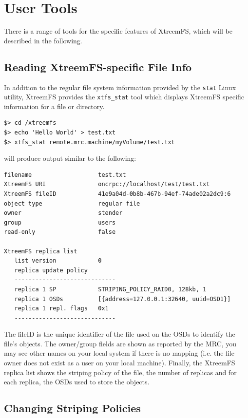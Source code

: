 \documentclass[a4paper,10pt]{book}
\begin{document}
\section{User Tools}

There is a range of tools for the specific features of XtreemFS, which will be described in the following.

\subsection{Reading XtreemFS-specific File Info}

In addition to the regular file system information provided by the \texttt{stat} Linux utility, XtreemFS provides the \texttt{xtfs\_stat} tool which displays XtreemFS specific information for a file or directory.


\begin{verbatim}
$> cd /xtreemfs
$> echo 'Hello World' > test.txt
$> xtfs_stat remote.mrc.machine/myVolume/test.txt
\end{verbatim}


will produce output similar to the following:


\begin{verbatim}
filename                   test.txt
XtreemFS URI               oncrpc://localhost/test/test.txt
XtreemFS fileID            41e9a04d-0b8b-467b-94ef-74ade02a2dc9:6
object type                regular file
owner                      stender
group                      users
read-only                  false

XtreemFS replica list
   list version            0
   replica update policy
   -----------------------------
   replica 1 SP            STRIPING_POLICY_RAID0, 128kb, 1
   replica 1 OSDs          [{address=127.0.0.1:32640, uuid=OSD1}]
   replica 1 repl. flags   0x1
   -----------------------------
\end{verbatim}


The fileID  is the unique identifier of the file used on the OSDs to identify the file's objects. The owner/group fields are shown as reported by the MRC, you may see other names on your local system if there is no mapping (i.e. the file owner does not exist as a user on your local machine).
Finally, the XtreemFS replica list shows the striping policy of the file, the number of replicas and for each replica, the OSDs used to store the objects.


\subsection{Changing Striping Policies}
\end{document}
